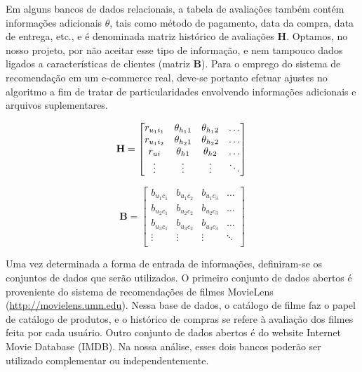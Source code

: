 Em alguns bancos de dados relacionais, a tabela de avaliações também contém informações adicionais $\theta$, tais como método de pagamento, data da compra, data de entrega, etc., e é denominada matriz histórico de avaliações $\mathbf{H}$. Optamos, no nosso projeto, por não aceitar esse tipo de informação, e nem tampouco dados ligados a características de clientes (matriz $\mathbf{B}$). Para o emprego do sistema de recomendação em um e-commerce real, deve-se portanto efetuar ajustes no algoritmo a fim de tratar de particularidades envolvendo informações adicionais e arquivos suplementares.

\begin{equation} 
\mathbf{H} =
\begin{bmatrix} 
 r_{u_1 i_1} &  \theta_{h_1 1} &  \theta_{h_1 2} & \dots   \\
 r_{u_1 i_2} &  \theta_{h_2 1} &  \theta_{h_2 2} & \dots   \\
 r_{u i} &  \theta_{h 1} &  \theta_{h 2} & \dots   \\
 \vdots &  \vdots &  \vdots  & \ddots   \\
 \end{bmatrix} \\
\end{equation}

\begin{equation}
	\mathbf{B} = 
\begin{bmatrix} 
 b_{u_1 c_1} &  b_{u_1 c_2} &  b_{u_1 c_3}  & \dots   \\
 b_{u_2 c_1} &  b_{u_2 c_2} &  b_{u_2 c_3}  & \dots   \\
 b_{u_3 c_1} &  b_{u_3 c_2} &  b_{u_3 c_3}  & \dots  \\ 
 \vdots &  \vdots &  \vdots  & \ddots   \\
 \end{bmatrix}
\end{equation}

Uma vez determinada a forma de entrada de informações, definiram-se os conjuntos de dados que serão utilizados. O primeiro conjunto de dados abertos é proveniente do sistema de recomendações de filmes MovieLens (\url{http://movielens.umn.edu}). Nessa base de dados, o catálogo de filme faz o papel de catálogo de produtos, e o histórico de compras se refere à avaliação dos filmes feita por cada usuário. Outro conjunto de dados abertos é do website Internet Movie Database (IMDB). Na nossa análise, esses dois bancos poderão ser utilizado complementar ou independentemente.


